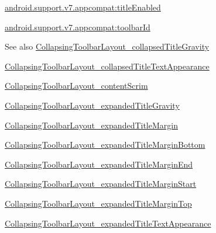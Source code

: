 {\ttfamily \hyperlink{classandroid_1_1support_1_1v7_1_1appcompat_1_1R_1_1styleable_a9dbf91222ca3cd313d450c7f1c17db70}{android.\+support.\+v7.\+appcompat\+:title\+Enabled}}

{\ttfamily \hyperlink{classandroid_1_1support_1_1v7_1_1appcompat_1_1R_1_1styleable_a9b1b730dcc059136fa07007ab41fcc78}{android.\+support.\+v7.\+appcompat\+:toolbar\+Id}}

\begin{DoxySeeAlso}{See also}
\hyperlink{classandroid_1_1support_1_1v7_1_1appcompat_1_1R_1_1styleable_aca00ebe0643a3a5ded86879fbff26955}{Collapsing\+Toolbar\+Layout\+\_\+collapsed\+Title\+Gravity} 

\hyperlink{classandroid_1_1support_1_1v7_1_1appcompat_1_1R_1_1styleable_af3614fd0af2e5e72723efefdb3be481a}{Collapsing\+Toolbar\+Layout\+\_\+collapsed\+Title\+Text\+Appearance} 

\hyperlink{classandroid_1_1support_1_1v7_1_1appcompat_1_1R_1_1styleable_a9bd6e1eb8c17d8f0f33567b77c829a5a}{Collapsing\+Toolbar\+Layout\+\_\+content\+Scrim} 

\hyperlink{classandroid_1_1support_1_1v7_1_1appcompat_1_1R_1_1styleable_adbe8dfae693ce3de1ae6617648f8652c}{Collapsing\+Toolbar\+Layout\+\_\+expanded\+Title\+Gravity} 

\hyperlink{classandroid_1_1support_1_1v7_1_1appcompat_1_1R_1_1styleable_aa0c9f6ddca433d8759b5d37b92f038f0}{Collapsing\+Toolbar\+Layout\+\_\+expanded\+Title\+Margin} 

\hyperlink{classandroid_1_1support_1_1v7_1_1appcompat_1_1R_1_1styleable_a9921e0babb5ad3a5043223af603a47c0}{Collapsing\+Toolbar\+Layout\+\_\+expanded\+Title\+Margin\+Bottom} 

\hyperlink{classandroid_1_1support_1_1v7_1_1appcompat_1_1R_1_1styleable_ad4ab1dac8092468e823d2ec10e403b6c}{Collapsing\+Toolbar\+Layout\+\_\+expanded\+Title\+Margin\+End} 

\hyperlink{classandroid_1_1support_1_1v7_1_1appcompat_1_1R_1_1styleable_a1f5a83e047a2bec57c2d0fe4f5fff481}{Collapsing\+Toolbar\+Layout\+\_\+expanded\+Title\+Margin\+Start} 

\hyperlink{classandroid_1_1support_1_1v7_1_1appcompat_1_1R_1_1styleable_a0d5fd646e714ea1e44ffb383a0fff8cf}{Collapsing\+Toolbar\+Layout\+\_\+expanded\+Title\+Margin\+Top} 

\hyperlink{classandroid_1_1support_1_1v7_1_1appcompat_1_1R_1_1styleable_af1872845d84b104e9c1a63abd2fadcd0}{Collapsing\+Toolbar\+Layout\+\_\+expanded\+Title\+Text\+Appearance} 


\end{DoxySeeAlso}
